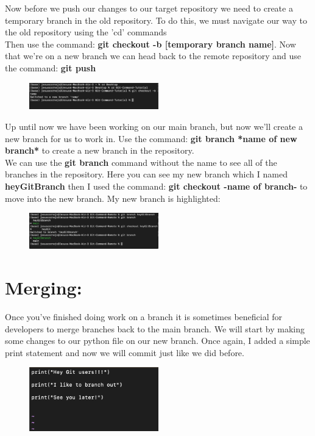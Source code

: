 \documentclass[10pt,twocolumn]{article}
\begin{document}
\newpage Now before we push our changes to our target repository we need to create a temporary branch in the old repository. To do this, we must navigate our way to the old repository using the 'cd' commands\\
Then use the command: \textbf{git checkout -b [temporary branch name]}. Now that we're on a new branch we can head back to the remote repository and use the command: \textbf{git push}\\

\begin{figure}[h!]
\center
\includegraphics[width=0.5\textwidth]{screenshots/sc9.png}
\end{figure}

Up until now we have been working on our main branch, but now we'll create a new branch for us to work in. Use the command: \textbf{git branch *name of new branch*} to create a new branch in the repository.\\
We can use the \textbf{git branch} command without the name to see all of the branches in the repository. Here you can see my new branch which I named \textbf{heyGitBranch} then I used the command: \textbf{git checkout -name of branch-} to move into the new branch. My new branch is highlighted:\\

\begin{figure}[h!]
\center
\includegraphics[width=0.5\textwidth]{screenshots/sc10.png}
\end{figure}


\newpage

\section{Merging:}
Once you've finished doing work on a branch it is sometimes beneficial for developers to merge branches back to the main branch. We will start by making some changes to our python file on our new branch. Once again, I added a simple print statement and now we will commit just like we did before.

\begin{figure}[h!]
\center
\includegraphics[width=0.5\textwidth]{screenshots/sc11.png}
\end{figure}
\end{document}
